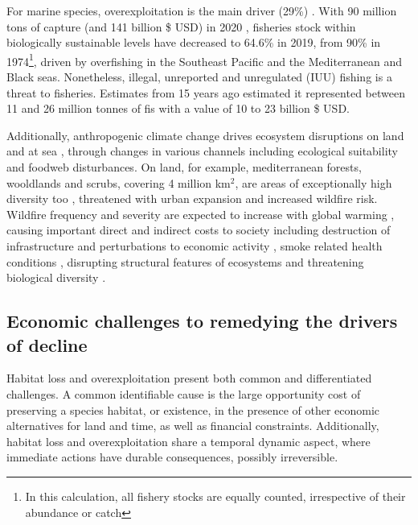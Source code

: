 For marine species, overexploitation is the main driver (29\%) \citep{ipbes_2022_6417333}. With 90 million tons of capture  (and 141 billion \$ USD)  in 2020 \citep{fao_2022_state}, fisheries stock within biologically sustainable levels have decreased to 64.6\% in 2019, from 90\% in 1974\footnote{ In this calculation, all fishery stocks are equally counted, irrespective of their abundance or catch}, driven by overfishing in the Southeast Pacific and the Mediterranean and Black seas. Nonetheless, illegal, unreported and unregulated (IUU) fishing is a threat to fisheries. Estimates from 15 years ago \citep{agnew_estimating_2009} estimated it represented between 11 and 26 million tonnes of fis with a value of 10 to 23 billion \$ USD. 
 
Additionally, anthropogenic climate change drives ecosystem disruptions on land \citep{burrell_anthropogenic_2020, conradi_reassessment_2024} and at sea \citep{gomes_marine_2024}, through changes in various channels including ecological suitability and foodweb disturbances. On land, for example, mediterranean forests, wooldlands and scrubs, covering 4 million km$^2$, are areas of exceptionally high diversity too \citep{Mooney2001, blondel_2010}, threatened with urban expansion and increased wildfire risk. Wildfire frequency and severity are expected to increase with global warming \citep{Dupuy2019ClimateCI}, causing important direct and indirect costs to society including destruction of infrastructure and perturbations to economic activity \citep{wang_economic_2021}, smoke related health conditions \citep{burke_wildfire_2023, heft-neal_behavior_2023}, disrupting structural features of ecosystems \citep{Ayars2023} and threatening biological diversity \citep{Wintle2020}.



\subsection*{Economic challenges to remedying the drivers of decline}

Habitat loss and overexploitation present both common and differentiated challenges. A common identifiable cause is the large opportunity cost of preserving a species habitat, or existence, in the presence of other economic alternatives for land and time, as well as financial constraints. Additionally, habitat loss and overexploitation share a temporal dynamic aspect, where immediate actions have durable consequences, possibly irreversible.


